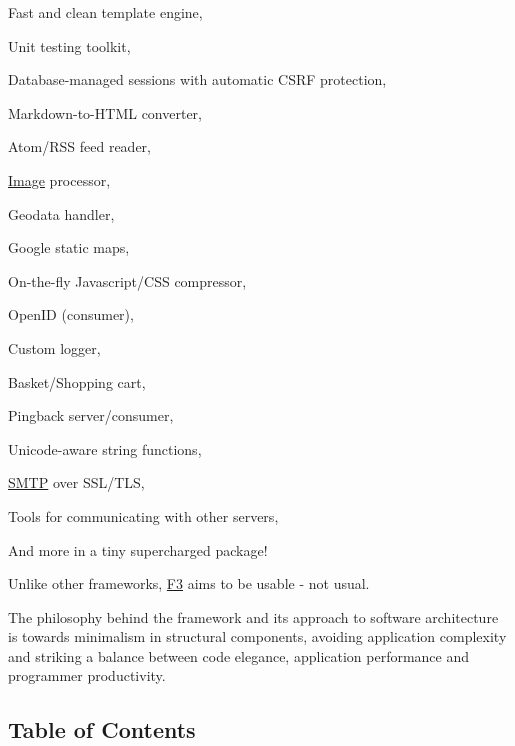 \begin{DoxyItemize}
\item Fast and clean template engine,
\item Unit testing toolkit,
\item Database-\/managed sessions with automatic C\+S\+RF protection,
\item Markdown-\/to-\/\+H\+T\+ML converter,
\item Atom/\+R\+SS feed reader,
\item \hyperlink{class_image}{Image} processor,
\item Geodata handler,
\item Google static maps,
\item On-\/the-\/fly Javascript/\+C\+SS compressor,
\item Open\+ID (consumer),
\item Custom logger,
\item Basket/\+Shopping cart,
\item Pingback server/consumer,
\item Unicode-\/aware string functions,
\item \hyperlink{class_s_m_t_p}{S\+M\+TP} over S\+S\+L/\+T\+LS,
\item Tools for communicating with other servers,
\item And more in a tiny supercharged package!
\end{DoxyItemize}

Unlike other frameworks, \hyperlink{class_f3}{F3} aims to be usable -\/ not usual.

\href{https://flattr.com/submit/auto?user_id=phpfatfree&url=https://github.com/bcosca/fatfree}{\tt }

The philosophy behind the framework and its approach to software architecture is towards minimalism in structural components, avoiding application complexity and striking a balance between code elegance, application performance and programmer productivity.

\href{https://www.paypal.com/cgi-bin/webscr?cmd=_s-xclick&hosted_button_id=MJSQL8N5LPDAY}{\tt }



\subsection*{Table of Contents}


